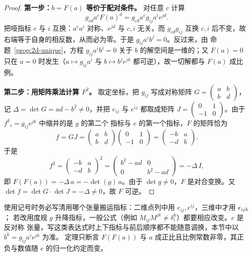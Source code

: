 \begin{proof}
\textbf{第一步：$b=F(a)$ 等价于配对条件。}
对任意 $c$ 计算
\[
g_{cd}a^cF(a)^d=g_{cd}a^cg_{ij}a^ie^{jd}.
\]
把哑指标 $c$ 与 $i$ 互换：$a^ca^i$ 对称、$e^{jd}$ 与 $c,i$ 无关，而 $g_{cd}g_{ij}$ 互换 $c,i$
后不变，故右端等于自身的相反数，从而必为零。于是 $g_{ij}a^ib^j=0$。反过来，由
命题~\ref{prop:2d-unique}，方程 $g_{ij}a^ib^j=0$ 关于 $b$ 的解空间是一维的；又 $F(a)=0$ 只在
$a=0$ 时发生（$a\mapsto g_{ij}a^i$ 与 $b\mapsto b^je^{jk}$ 都可逆），故一切解都与 $F(a)$ 成比例。

\textbf{第二步：用矩阵乘法计算 $F^2$。}
取定坐标，把 $g_{ij}$ 写成对称矩阵 $G=\begin{pmatrix}a&b\\b&d\end{pmatrix}$，记
$\Delta=\det G=ad-b^2\ne0$，并把 $e_{ij}$ 与 $e^{ij}$ 都取成矩阵
$J=\begin{pmatrix}0&1\\-1&0\end{pmatrix}$。由于 ${f^k}_i=g_{ij}e^{jk}$ 中缩并的是 $g$ 的第二个
指标与 $e$ 的第一个指标，$F$ 的矩阵恰为
\[
f=GJ=\begin{pmatrix}a&b\\b&d\end{pmatrix}\begin{pmatrix}0&1\\-1&0\end{pmatrix}
=\begin{pmatrix}-b&a\\-d&b\end{pmatrix}.
\]
于是
\[
f^2=\begin{pmatrix}-b&a\\-d&b\end{pmatrix}^2
=\begin{pmatrix}b^2-ad&0\\0&b^2-ad\end{pmatrix}
=-\Delta\,I,
\]
即 $F(F(a))=-\Delta\,a=-\det(g)\,a$。由于 $\det g\ne0$，$F$ 是对合变换。又
$\det f=\det G\cdot\det J=-\Delta\ne0$，故 $F$ 可逆。
\end{proof}

\begin{remark}
使用记号时务必写清用哪个张量搬运指标：二维点列中用 $e_{ij},e^{ij}$，三维中才用 $\epsilon_{ijk}$；
若改用度规 $g$ 升降指标，一般公式（例如 $M_{ij}M^{jk}\ne\delta^k_i$）都要相应改变。$e$ 是反对称
张量，写这类表达式时上下指标与前后顺序都不能随意调换，本节中以 $b^k=g_{ij}a^ie^{jk}$ 为准。
定理只断言 $F(F(a))$ 与 $a$ 成正比且比例常数非零，其正负与数值随 $e$ 的归一化约定而变。
\end{remark}

